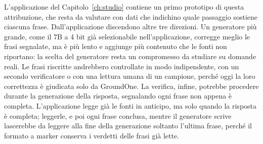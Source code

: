 L'applicazione del Capitolo~\ref{ch:studio} contiene un primo prototipo di questa attribuzione, che resta da valutare
con dati che indichino quale passaggio sostiene ciascuna frase. Dall'applicazione discendono altre tre direzioni. Un generatore più grande, come il 7B a 4 bit già selezionabile nell'applicazione, corregge meglio le frasi segnalate, ma è più lento e aggiunge più contenuto che le fonti non riportano: la scelta del generatore resta un compromesso da studiare su domande reali. Le frasi riscritte andrebbero controllate in modo indipendente, con
un secondo verificatore o con una lettura umana di un campione, perché oggi la loro correttezza è giudicata solo da
GroundOne. La verifica, infine, potrebbe procedere durante la generazione della risposta, segnalando ogni frase non appena è completa. L'applicazione legge già le fonti in anticipo, ma solo quando la risposta è completa; leggerle, e poi ogni frase conclusa, mentre il generatore scrive lascerebbe da leggere alla fine della generazione soltanto l'ultima frase, perché il formato a marker conserva i verdetti delle frasi già lette.
